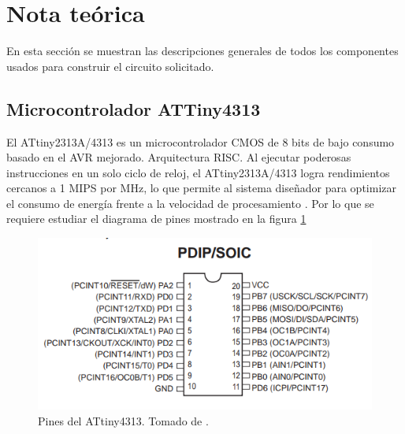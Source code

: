 \section{Nota teórica}
En esta sección se muestran las descripciones generales de todos los componentes usados para construir el circuito solicitado.
\subsection*{Microcontrolador ATTiny4313}
El ATtiny2313A/4313 es un microcontrolador CMOS de 8 bits de bajo consumo basado en el AVR mejorado.
Arquitectura RISC. Al ejecutar poderosas instrucciones en un solo ciclo de reloj, el ATtiny2313A/4313 logra rendimientos cercanos a 1 MIPS por MHz, lo que permite al sistema diseñador para optimizar el consumo de energía frente a la velocidad de procesamiento \cite{web}. Por lo que se requiere estudiar el diagrama de pines mostrado en la figura \ref{fig1}
\begin{figure}[H]
\centering
\includegraphics[width=.8\linewidth]{Imagenes/1.png}
 \caption{Pines del ATtiny4313. Tomado de \cite{web}.}
 \label{fig1}
\end{figure}
